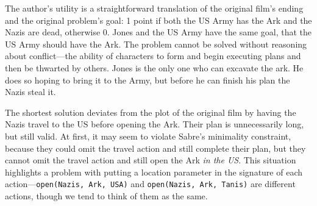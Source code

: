 \documentclass{nilreport}
\begin{document}
The author's utility is a straightforward translation of the original
film's ending and the original problem's goal: 1 point if both the
US Army has the Ark and the Nazis are dead, otherwise 0. Jones and
the US Army have the same goal, that the US Army should have the Ark.
The problem cannot be solved without reasoning about conflict---the
ability of characters to form and begin executing plans and then be
thwarted by others. Jones is the only one who can excavate the ark.
He does so hoping to bring it to the Army, but before he can finish
his plan the Nazis steal it.

\medskip{}
\noindent{}

\medskip{}

\noindent The shortest solution deviates from the plot of the original
film by having the Nazis travel to the US before opening the Ark.
Their plan is unnecessarily long, but still valid. At first, it may
seem to violate Sabre's minimality constraint, because they could
omit the travel action and still complete their plan, but they cannot
omit the travel action and still open the Ark \emph{in the US}. This
situation highlights a problem with putting a location parameter in
the signature of each action---\texttt{open(Nazis, Ark, USA)} and
\texttt{open(Nazis, Ark, Tanis)} are different actions, though we
tend to think of them as the same.

\medskip{}
\noindent{}
\end{document}
